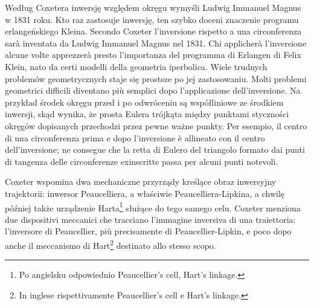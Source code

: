 Według Coxetera \cite{coxeter_1967} inwersję względem okręgu wymyśli Ludwig Immanuel Magnus w 1831 roku. %
Kto raz zastosuje inwersję, ten szybko doceni znaczenie programu erlangeńskiego Kleina. %
Secondo Coxeter \cite{coxeter_1967} l'inversione rispetto a una circonferenza sarà inventata da Ludwig Immanuel Magnus nel 1831. %
Chi applicherà l'inversione alcune volte apprezzerà presto l'importanza del programma di Erlangen di Felix Klein, nato da certi modelli della geometria iperbolica. %
%
%
Wiele trudnych problemów geometrycznych staje się prostsze po jej zastosowaniu. %
Molti problemi geometrici difficili diventano più semplici dopo l'applicazione dell'inversione. %
Na przykład środek okręgu przed i po odwróceniu są współliniowe ze środkiem inwersji, skąd wynika, że prosta Eulera trójkąta między punktami styczności okręgów dopisanych przechodzi przez pewne ważne punkty. %
Per esempio, il centro di una circonferenza prima e dopo l'inversione è allineato con il centro dell'inversione; ne consegue che la retta di Eulero del triangolo formato dai punti di tangenza delle circonferenze exinscritte passa per alcuni punti notevoli. %

Coxeter \cite[s. 98]{coxeter_1967} wspomina dwa mechaniczne przyrządy kreślące obraz inwersyjny trajektorii: inwersor Peaucelliera, a właściwie Peaucelliera-Lipkina, a chwilę później także urządzenie Harta\footnote{Po angielsku odpowiednio Peaucellier's cell, Hart's linkage.} służące do tego samego celu. %
Coxeter \cite[p. 98]{coxeter_1967} menziona due dispositivi meccanici che tracciano l'immagine inversiva di una traiettoria: l'inversore di Peaucellier, più precisamente di Peaucellier-Lipkin, e poco dopo anche il meccanismo di Hart\footnote{In inglese rispettivamente Peaucellier's cell e Hart's linkage.} destinato allo stesso scopo. %
%
%
%

